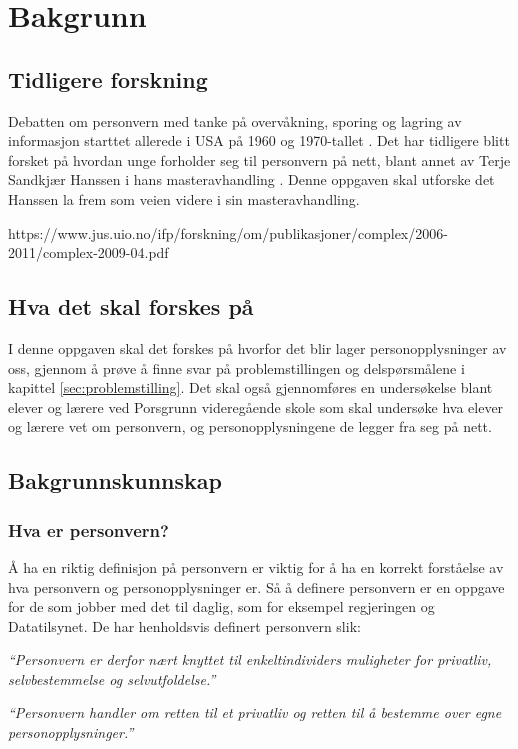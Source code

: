 \section{Bakgrunn}

\subsection{Tidligere forskning}
Debatten om personvern med tanke på overvåkning, sporing og lagring av informasjon starttet allerede i USA på 1960 og 1970-tallet \parencite[36]{bok:nissenbaum}. Det har tidligere blitt forsket på hvordan unge forholder seg til personvern på nett, blant annet av Terje Sandkjær Hanssen i hans masteravhandling \parencite{master:hanssen}. Denne oppgaven skal utforske det Hanssen la frem som veien videre i sin masteravhandling. \parencite[69]{master:hanssen}

https://www.jus.uio.no/ifp/forskning/om/publikasjoner/complex/2006-2011/complex-2009-04.pdf


\subsection{Hva det skal forskes på}
I denne oppgaven skal det forskes på hvorfor det blir lager personopplysninger av oss, gjennom å prøve å finne svar på problemstillingen og delspørsmålene i kapittel \ref{sec:problemstilling}. Det skal også gjennomføres en undersøkelse blant elever og lærere ved Porsgrunn videregående skole som skal undersøke hva elever og lærere vet om personvern, og personopplysningene de legger fra seg på nett.

\subsection{Bakgrunnskunnskap}
\subsubsection{Hva er personvern?}
Å ha en riktig definisjon på personvern er viktig for å ha en korrekt forståelse av hva personvern og personopplysninger er. Så å definere personvern er en oppgave for de som jobber med det til daglig, som for eksempel regjeringen og Datatilsynet. De har henholdsvis definert personvern slik:

\textit{``Personvern er derfor nært knyttet til enkeltindividers muligheter for privatliv, selvbestemmelse og selvutfoldelse.''} \parencite{regjeringen_personvern}

\textit{``Personvern handler om retten til et privatliv og retten til å bestemme over egne personopplysninger.''} \parencite{datatilsynet_personvern}

\newpage